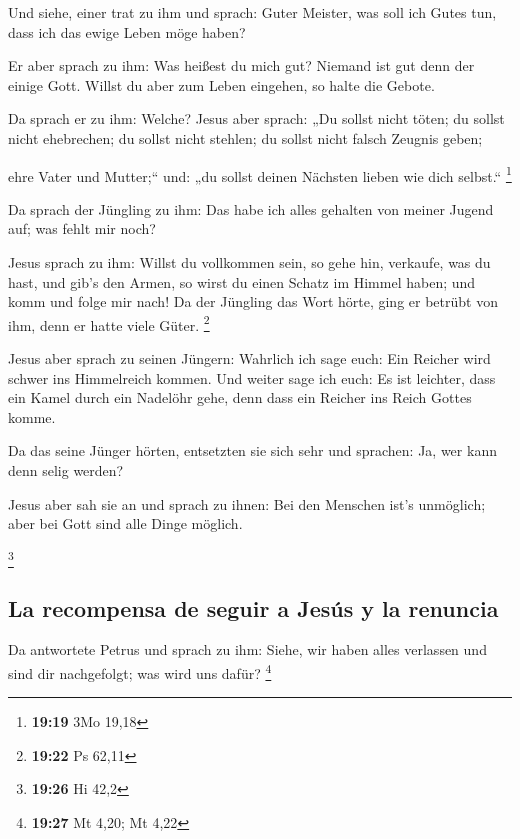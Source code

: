  Und siehe, einer trat zu ihm und sprach: Guter Meister,
was soll ich Gutes tun, dass ich das ewige Leben möge haben?

 Er aber sprach zu ihm: Was heißest du mich gut? Niemand
ist gut denn der einige Gott. Willst du aber zum Leben eingehen, so
halte die Gebote.

 Da sprach er zu ihm: Welche? Jesus aber sprach: „Du
sollst nicht töten; du sollst nicht ehebrechen; du sollst nicht stehlen;
du sollst nicht falsch Zeugnis geben;

 ehre Vater und Mutter;`` und: „du sollst deinen Nächsten
lieben wie dich selbst.`` \footnote{\textbf{19:19} 3Mo 19,18}

 Da sprach der Jüngling zu ihm: Das habe ich alles
gehalten von meiner Jugend auf; was fehlt mir noch?

 Jesus sprach zu ihm: Willst du vollkommen sein, so gehe
hin, verkaufe, was du hast, und gib's den Armen, so wirst du einen
Schatz im Himmel haben; und komm und folge mir nach!  Da
der Jüngling das Wort hörte, ging er betrübt von ihm, denn er hatte
viele Güter. \footnote{\textbf{19:22} Ps 62,11}

 Jesus aber sprach zu seinen Jüngern: Wahrlich ich sage
euch: Ein Reicher wird schwer ins Himmelreich kommen. 
Und weiter sage ich euch: Es ist leichter, dass ein Kamel durch ein
Nadelöhr gehe, denn dass ein Reicher ins Reich Gottes komme.

 Da das seine Jünger hörten, entsetzten sie sich sehr und
sprachen: Ja, wer kann denn selig werden?

 Jesus aber sah sie an und sprach zu ihnen: Bei den
Menschen ist's unmöglich; aber bei Gott sind alle Dinge möglich.

\footnote{\textbf{19:26} Hi 42,2}

\hypertarget{la-recompensa-de-seguir-a-jesuxfas-y-la-renuncia}{%
\subsection{La recompensa de seguir a Jesús y la
renuncia}\label{la-recompensa-de-seguir-a-jesuxfas-y-la-renuncia}}

 Da antwortete Petrus und sprach zu ihm: Siehe, wir haben
alles verlassen und sind dir nachgefolgt; was wird uns dafür?
\footnote{\textbf{19:27} Mt 4,20; Mt 4,22}

